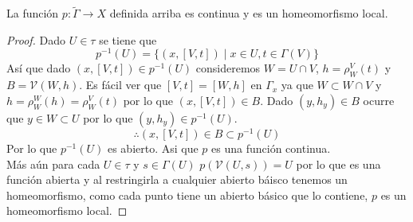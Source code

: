 \documentclass[14pt]{extarticle}
\begin{document}
\begin{proposicion}{}{}
    La función $p:\widetilde{\Gamma}\rightarrow X$
    definida arriba es continua y es un homeomorfismo 
    local.
\end{proposicion}
\begin{proof}
    Dado $U\in\tau$ se tiene que 
    $$p^{-1}(U)=\{(x,[V,t])\mid x\in U, t\in \Gamma(V)\}$$
    Así que dado $(x, [V,t])\in p^{-1}(U)$ 
    consideremos $W=U\cap V$, $h =\rho_{W}^{V}(t)$ 
    y $B=\mathcal{V}(W,h)$.
    Es fácil ver que $[V,t]=[W,h]$ en $\Gamma_x$ ya que 
    $W\subset W\cap V$ y $h = \rho_{W}^{W}(h)=\rho_{W}^{V}(t)$
    por lo que $(x,[V,t])\in B$.
    Dado $(y,h_y)\in B$ ocurre que $y\in W\subset U$
    por lo que $(y,h_y)\in p^{-1}(U)$.
    $$\therefore (x,[V,t])\in B\subset p^{-1}(U)$$
    Por lo que $p^{-1}(U)$ es abierto. Asi que $p$
    es una función continua.\\
    Más aún para cada $U\in\tau$ y $s\in \Gamma(U)$
    $p(\mathcal{V}(U,s))=U$ por lo que es una función abierta
    y al restringirla a cualquier abierto báisco tenemos 
    un homeomorfismo, como cada punto tiene un abierto básico 
    que lo contiene, $p$ es un homeomorfismo local.
\end{proof}
\end{document}
